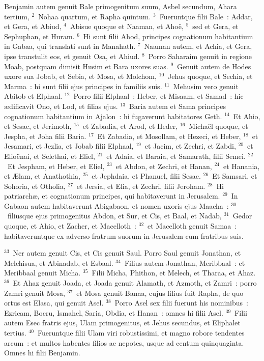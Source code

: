 \lettrine[lines=3,image=true,loversize=0.05,lraise=-0.03]{B}{}enjamin autem genuit Bale primogenitum suum, Asbel secundum, Ahara tertium,
${}^{2}$~Nohaa quartum, et Rapha quintum.
${}^{3}$~Fueruntque filii Bale~: Addar, et Gera, et Abiud,
${}^{4}$~Abisue quoque et Naaman, et Aho\"e,
${}^{5}$~sed et Gera, et Sephuphan, et Huram.
${}^{6}$~Hi sunt filii Ahod, principes cognationum habitantium in Gabaa, qui translati sunt in Manahath.
${}^{7}$~Naaman autem, et Achia, et Gera, ipse transtulit eos, et genuit Osa, et Ahiud.
${}^{8}$~Porro Saharaim genuit in regione Moab, postquam dimisit Husim et Bara uxores suas.
${}^{9}$~Genuit autem de Hodes uxore sua Jobab, et Sebia, et Mosa, et Molchom,
${}^{10}$~Jehus quoque, et Sechia, et Marma~: hi sunt filii ejus principes in familiis suis.
${}^{11}$~Mehusim vero genuit Abitob et Elphaal.
${}^{12}$~Porro filii Elphaal~: Heber, et Misaam, et Samad~: hic \ae dificavit Ono, et Lod, et filias ejus.
${}^{13}$~Baria autem et Sama principes cognationum habitantium in Ajalon~: hi fugaverunt habitatores Geth.
${}^{14}$~Et Ahio, et Sesac, et Jerimoth,
${}^{15}$~et Zabadia, et Arod, et Heder,
${}^{16}$~Micha\"el quoque, et Jespha, et Joha filii Baria.
${}^{17}$~Et Zabadia, et Mosollam, et Hezeci, et Heber,
${}^{18}$~et Jesamari, et Jezlia, et Jobab filii Elphaal,
${}^{19}$~et Jacim, et Zechri, et Zabdi,
${}^{20}$~et Elio\"enai, et Selethai, et Eliel,
${}^{21}$~et Adaia, et Baraia, et Samarath, filii Semei.
${}^{22}$~Et Jespham, et Heber, et Eliel,
${}^{23}$~et Abdon, et Zechri, et Hanan,
${}^{24}$~et Hanania, et \AE lam, et Anathothia,
${}^{25}$~et Jephdaia, et Phanuel, filii Sesac.
${}^{26}$~Et Samsari, et Sohoria, et Otholia,
${}^{27}$~et Jersia, et Elia, et Zechri, filii Jeroham.
${}^{28}$~Hi patriarch\ae , et cognationum principes, qui habitaverunt in Jerusalem.
${}^{29}$~In Gabaon autem habitaverunt Abigabaon, et nomen uxoris ejus Maacha~:
${}^{30}$~filiusque ejus primogenitus Abdon, et Sur, et Cis, et Baal, et Nadab,
${}^{31}$~Gedor quoque, et Ahio, et Zacher, et Macelloth~:
${}^{32}$~et Macelloth genuit Samaa~: habitaveruntque ex adverso fratrum suorum in Jerusalem cum fratribus suis.


${}^{33}$~Ner autem genuit Cis, et Cis genuit Saul. Porro Saul genuit Jonathan, et Melchisua, et Abinadab, et Esbaal.
${}^{34}$~Filius autem Jonathan, Meribbaal~: et Meribbaal genuit Micha.
${}^{35}$~Filii Micha, Phithon, et Melech, et Tharaa, et Ahaz.
${}^{36}$~Et Ahaz genuit Joada, et Joada genuit Alamath, et Azmoth, et Zamri~: porro Zamri genuit Mosa,
${}^{37}$~et Mosa genuit Banaa, cujus filius fuit Rapha, de quo ortus est Elasa, qui genuit Asel.
${}^{38}$~Porro Asel sex filii fuerunt his nominibus~: Ezricam, Bocru, Ismahel, Saria, Obdia, et Hanan~: omnes hi filii Asel.
${}^{39}$~Filii autem Esec fratris ejus, Ulam primogenitus, et Jehus secundus, et Eliphalet tertius.
${}^{40}$~Fueruntque filii Ulam viri robustissimi, et magno robore tendentes arcum~: et multos habentes filios ac nepotes, usque ad centum quinquaginta. Omnes hi filii Benjamin.

